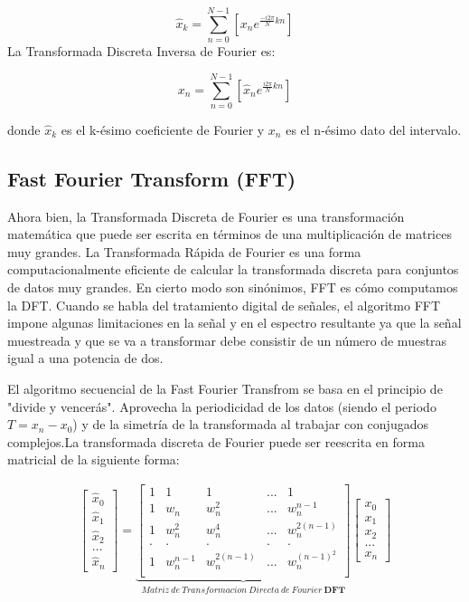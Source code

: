 \documentclass{report}
\begin{document}
\[
\hat{x}_k = \sum\limits_{n=0}^{N-1} \left[ x_ne^{\frac{-i2\pi}{N}kn}\right]
\]
La Transformada Discreta Inversa de Fourier es:

\[
x_n = \sum\limits_{n=0}^{N-1} \left[ \hat{x}_ne^{\frac{i2\pi}{N}kn}\right]
\]

\noindent donde $\hat{x}_k$ es el k-ésimo coeficiente de Fourier y $x_n$ es el n-ésimo dato del intervalo.

\subsection*{Fast Fourier Transform (FFT)}
\noindent Ahora bien, la Transformada Discreta de Fourier es una transformación matemática que puede ser escrita en términos de una multiplicación de matrices muy grandes. La Transformada Rápida de Fourier es una forma computacionalmente eficiente de calcular la transformada discreta para conjuntos de datos muy grandes. En cierto modo son sinónimos, FFT es cómo computamos la DFT.
Cuando se habla del tratamiento digital de señales, el algoritmo FFT impone algunas limitaciones en la señal y en el espectro resultante ya que la señal muestreada y que se va a transformar debe consistir de un número de muestras igual a una potencia de dos.\medskip

El algoritmo secuencial de la Fast Fourier Transfrom se basa en el principio de "divide y vencerás". Aprovecha la periodicidad de los datos (siendo el periodo $T = x_n - x_0$) y de la simetría de la transformada al trabajar con conjugados complejos.La transformada discreta de Fourier puede ser reescrita en forma matricial de la siguiente forma:\medskip

\begin{gather}
    \begin{bmatrix}
        \hat{x}_0 \\ \hat{x}_1 \\ \hat{x}_2 \\ ... \\\hat{x}_n
    \end{bmatrix}
    =
    \underbrace{
    \begin{bmatrix}
        1 & 1 & 1 & ... & 1\\
        1 & w_n & w_n^2 & ... & w_n^{n-1}\\
        1 & w_n^2 & w_n^4 & ... & w_n^{2(n-1)}\\
        . & . & . & . & .\\
        1 & w_n^{n-1} & w_n^{2(n-1)} & ... & w_n^{(n-1)^2}\\
    \end{bmatrix}
    }_{Matriz\:de\:Transformacion\:Directa\:de\:Fourier\:\textbf{DFT}}
    \begin{bmatrix}
        x_0 \\ x_1 \\ x_2 \\ ... \\ x_n
    \end{bmatrix}
\end{gather}
\end{document}

